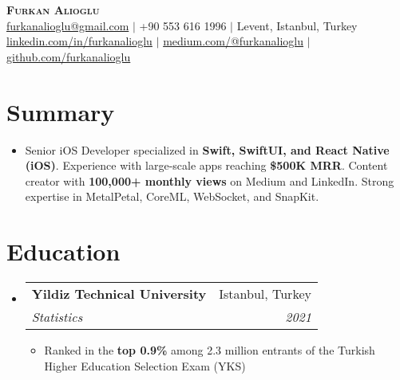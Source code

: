 \documentclass[letterpaper,11pt]{article}
\makeatletter
\newcommand{\resumeItem}[1]{
  \item\small{
    {#1 \vspace{-2pt}}
  }
}
\newcommand{\resumeSubheading}[4]{
  \vspace{-1pt}\item
    \begin{tabular*}{0.97\textwidth}[t]{l@{\extracolsep{\fill}}r}
      \textbf{#1} & #2 \\
      \textit{\small#3} & \textit{\small #4} \\
    \end{tabular*}\vspace{-6pt}
}
\newcommand{\resumeSubHeadingListStart}{\begin{itemize}[leftmargin=0.15in, label={}, itemsep=-2pt]}
\newcommand{\resumeSubHeadingListEnd}{\end{itemize}}
\newcommand{\resumeItemListStart}{\begin{itemize}[itemsep=-2pt]}
\newcommand{\resumeItemListEnd}{\end{itemize}\vspace{-4pt}}
\makeatother
\begin{document}
\begin{center}
    \textbf{\Huge \scshape Furkan Alioglu} \\ \vspace{2pt}
    \small
     \href{mailto:furkanalioglu@gmail.com}{furkanalioglu@gmail.com} $|$ 
     +90 553 616 1996 $|$
     Levent, Istanbul, Turkey \\ \vspace{2pt}
     \href{https://linkedin.com/in/furkanalioglu}{linkedin.com/in/furkanalioglu} $|$
     \href{https://medium.com/@furkanalioglu}{medium.com/@furkanalioglu} $|$
     \href{https://github.com/furkanalioglu}{github.com/furkanalioglu}
\end{center}

\section{Summary}
\vspace{-2pt}
\resumeSubHeadingListStart
\item{
    Senior iOS Developer specialized in \textbf{Swift, SwiftUI, and React Native (iOS)}. Experience with large-scale apps reaching \textbf{\$500K MRR}. Content creator with \textbf{100,000+ monthly views} on Medium and LinkedIn. Strong expertise in MetalPetal, CoreML, WebSocket, and SnapKit.
}
\resumeSubHeadingListEnd

\section{Education}
\vspace{-2pt}
  \resumeSubHeadingListStart
    \resumeSubheading
      {Yildiz Technical University}{Istanbul, Turkey}
      {Statistics}{2021}
      \resumeItemListStart
        \resumeItem{Ranked in the \textbf{top 0.9\%} among 2.3 million entrants of the Turkish Higher Education Selection Exam (YKS)}
      \resumeItemListEnd
  \resumeSubHeadingListEnd

\end{document}
